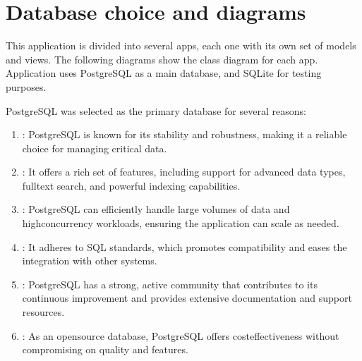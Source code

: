\documentclass[letterpaper,10pt,english]{sphinxmanual}
\begin{document}
\sphinxstepscope


\chapter{Database choice and diagrams}
\label{\detokenize{modules/diagrams:database-choice-and-diagrams}}\label{\detokenize{modules/diagrams::doc}}
\sphinxAtStartPar
This application is divided into several apps, each one with its own set of models and views. The following diagrams show the class diagram for each app.
Application uses PostgreSQL as a main database, and SQLite for testing purposes.

\sphinxAtStartPar
PostgreSQL was selected as the primary database for several reasons:
\begin{enumerate}
%
\item {} 
\sphinxAtStartPar
{}: PostgreSQL is known for its stability and robustness, making it a reliable choice for managing critical data.

\item {} 
\sphinxAtStartPar
{}: It offers a rich set of features, including support for advanced data types, full\sphinxhyphen{}text search, and powerful indexing capabilities.

\item {} 
\sphinxAtStartPar
{}: PostgreSQL can efficiently handle large volumes of data and high\sphinxhyphen{}concurrency workloads, ensuring the application can scale as needed.

\item {} 
\sphinxAtStartPar
{}: It adheres to SQL standards, which promotes compatibility and eases the integration with other systems.

\item {} 
\sphinxAtStartPar
{}: PostgreSQL has a strong, active community that contributes to its continuous improvement and provides extensive documentation and support resources.

\item {} 
\sphinxAtStartPar
{}: As an open\sphinxhyphen{}source database, PostgreSQL offers cost\sphinxhyphen{}effectiveness without compromising on quality and features.

\end{enumerate}
\end{document}
